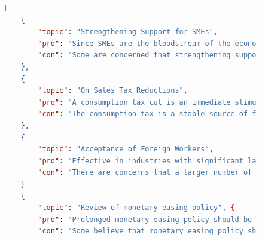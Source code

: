 \documentclass[final,5p,times,twocolumn,authoryear]{elsarticle}
\begin{document}
\begin{figure}[h]
\centering
      \begin{lstlisting}[language=json,firstnumber=1]
[
    {
        "topic": "Strengthening Support for SMEs",
        "pro": "Since SMEs are the bloodstream of the economy and are responsible for the majority of employment, especially in Japan, some argue that policies to improve the business environment and enable wage increases are essential. Further support is also needed because the entire local economy is enriched when SMEs are revitalized.",
        "con": "Some are concerned that strengthening support for SMEs may not be fair to large companies. Others argue that the principle of competition in the market should be respected and excessive intervention should be avoided, regardless of the size of the company."
    },
    {
        "topic": "On Sales Tax Reductions",
        "pro": "A consumption tax cut is an immediate stimulus measure and is expected to stimulate the economy as a whole through stimulating consumption. It is also supported by the viewpoint that it is not socially fair because it is regressive and places a heavy burden on low-income individuals." ,
        "con": "The consumption tax is a stable source of funding for social security, and tax cuts are considered to be an obstacle to fiscal soundness. Concerns have also been expressed that the reduction in funding from a consumption tax cut could affect other social security and public services."
    },
    {
        "topic": "Acceptance of Foreign Workers",
        "pro": "Effective in industries with significant labor shortages, foreign workers, especially those with highly specialized skills, can contribute to economic growth. Some argue that by bringing in new skills and knowledge, they also contribute to improving Japan's international competitiveness." ,.
        "con": "There are concerns that a larger number of foreign workers will have a negative impact on the domestic labor market, as they may cause cultural friction and encourage low-wage work. Some argue that employment of domestic workers may be squeezed."
    }
    {
        "topic": "Review of monetary easing policy", {
        "pro": "Prolonged monetary easing policy should be carefully reviewed because of concerns about the risk of inflation and increased market credit costs. In particular, price-pushing factors such as higher import costs due to a weaker yen should also be taken into account." ,
        "con": "Some believe that monetary easing policy should be maintained until the economy fully recovers. There is concern that a change in policy at this point could hinder the end of deflation and economic growth."

\end{lstlisting}
\end{figure}
\end{document}
